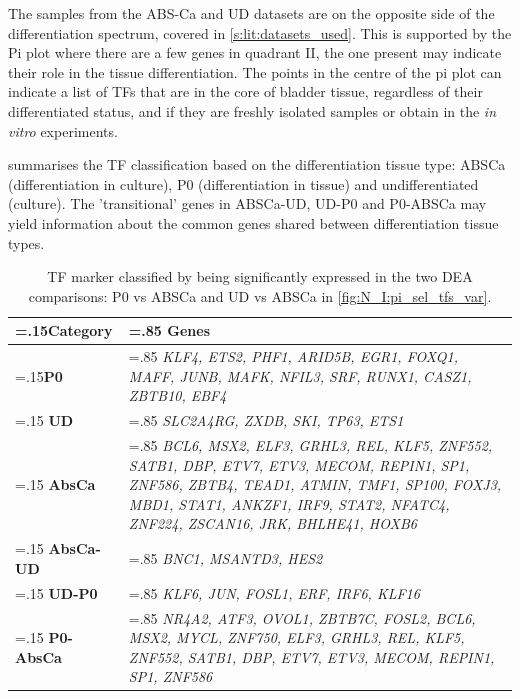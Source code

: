 The samples from the ABS-Ca and UD datasets are on the opposite side of the differentiation spectrum, covered in \cref{s:lit:datasets_used}. This is supported by the Pi plot where there are a few genes in quadrant II, the one present may indicate their role in the tissue differentiation. The points in the centre of the pi plot can indicate a list of TFs that are in the core of bladder tissue, regardless of their differentiated status, and if they are freshly isolated samples or obtain in the \textit{in vitro} experiments.


 summarises the TF classification based on the differentiation tissue type: ABSCa (differentiation in culture), P0 (differentiation in tissue) and undifferentiated (culture). The 'transitional' genes in ABSCa-UD, UD-P0 and P0-ABSCa may yield information about the common genes shared between differentiation tissue types.

\begin{table}[!htb]
  \centering
  \small
  \begin{tabularx}{\textwidth}{>{\hsize=.15\hsize}X|>{\hsize=.85\hsize}X}
    \toprule
    \textbf{Category} & \textbf{Genes} \\
    \midrule
    \textbf{P0} & \textit{KLF4, ETS2, PHF1, ARID5B, EGR1, FOXQ1, MAFF, JUNB, MAFK, NFIL3, SRF, RUNX1, CASZ1, ZBTB10, EBF4} \\
    \midrule
    \textbf{UD} & \textit{SLC2A4RG, ZXDB, SKI, TP63, ETS1} \\
    \midrule
    \textbf{AbsCa} & \textit{BCL6, MSX2, ELF3, GRHL3, REL, KLF5, ZNF552, SATB1, DBP, ETV7, ETV3, MECOM, REPIN1, SP1, ZNF586, ZBTB4, TEAD1, ATMIN, TMF1, SP100, FOXJ3, MBD1, STAT1, ANKZF1, IRF9, STAT2, NFATC4, ZNF224, ZSCAN16, JRK, BHLHE41, HOXB6} \\
    \midrule
    \textbf{AbsCa-UD} & \textit{BNC1, MSANTD3, HES2} \\
    \midrule
    \textbf{UD-P0} & \textit{KLF6, JUN, FOSL1, ERF, IRF6, KLF16} \\
    \midrule
    \textbf{P0-AbsCa} & \textit{NR4A2, ATF3, OVOL1, ZBTB7C, FOSL2, BCL6, MSX2, MYCL, ZNF750, ELF3, GRHL3, REL, KLF5, ZNF552, SATB1, DBP, ETV7, ETV3, MECOM, REPIN1, SP1, ZNF586} \\
    \bottomrule
  \end{tabularx}
  \caption[Tissue differentiation markers]{TF marker classified by being significantly expressed in the two DEA comparisons: P0 vs ABSCa and UD vs ABSCa in \cref{fig:N_I:pi_sel_tfs_var}.} 
  \label{tab:N_I:markers_diff}
\end{table}

